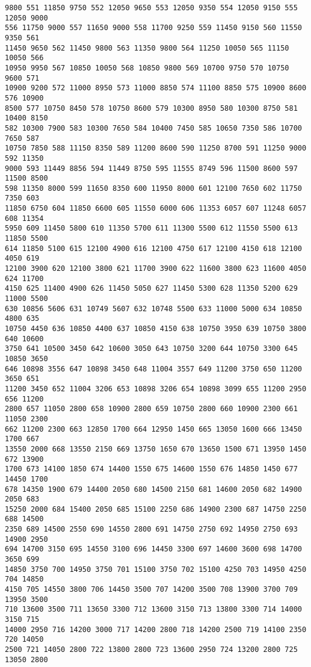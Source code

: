 \documentclass[11pt]{article}
\begin{document}
\begin{Verbatim}[commandchars=\\\{\}]
9800 551 11850 9750 552 12050 9650 553 12050 9350 554 12050 9150 555 12050 9000
556 11750 9000 557 11650 9000 558 11700 9250 559 11450 9150 560 11550 9350 561
11450 9650 562 11450 9800 563 11350 9800 564 11250 10050 565 11150 10050 566
10950 9950 567 10850 10050 568 10850 9800 569 10700 9750 570 10750 9600 571
10900 9200 572 11000 8950 573 11000 8850 574 11100 8850 575 10900 8600 576 10900
8500 577 10750 8450 578 10750 8600 579 10300 8950 580 10300 8750 581 10400 8150
582 10300 7900 583 10300 7650 584 10400 7450 585 10650 7350 586 10700 7650 587
10750 7850 588 11150 8350 589 11200 8600 590 11250 8700 591 11250 9000 592 11350
9000 593 11449 8856 594 11449 8750 595 11555 8749 596 11500 8600 597 11500 8500
598 11350 8000 599 11650 8350 600 11950 8000 601 12100 7650 602 11750 7350 603
11850 6750 604 11850 6600 605 11550 6000 606 11353 6057 607 11248 6057 608 11354
5950 609 11450 5800 610 11350 5700 611 11300 5500 612 11550 5500 613 11850 5500
614 11850 5100 615 12100 4900 616 12100 4750 617 12100 4150 618 12100 4050 619
12100 3900 620 12100 3800 621 11700 3900 622 11600 3800 623 11600 4050 624 11700
4150 625 11400 4900 626 11450 5050 627 11450 5300 628 11350 5200 629 11000 5500
630 10856 5606 631 10749 5607 632 10748 5500 633 11000 5000 634 10850 4800 635
10750 4450 636 10850 4400 637 10850 4150 638 10750 3950 639 10750 3800 640 10600
3750 641 10500 3450 642 10600 3050 643 10750 3200 644 10750 3300 645 10850 3650
646 10898 3556 647 10898 3450 648 11004 3557 649 11200 3750 650 11200 3650 651
11200 3450 652 11004 3206 653 10898 3206 654 10898 3099 655 11200 2950 656 11200
2800 657 11050 2800 658 10900 2800 659 10750 2800 660 10900 2300 661 11050 2300
662 11200 2300 663 12850 1700 664 12950 1450 665 13050 1600 666 13450 1700 667
13550 2000 668 13550 2150 669 13750 1650 670 13650 1500 671 13950 1450 672 13900
1700 673 14100 1850 674 14400 1550 675 14600 1550 676 14850 1450 677 14450 1700
678 14350 1900 679 14400 2050 680 14500 2150 681 14600 2050 682 14900 2050 683
15250 2000 684 15400 2050 685 15100 2250 686 14900 2300 687 14750 2250 688 14500
2350 689 14500 2550 690 14550 2800 691 14750 2750 692 14950 2750 693 14900 2950
694 14700 3150 695 14550 3100 696 14450 3300 697 14600 3600 698 14700 3650 699
14850 3750 700 14950 3750 701 15100 3750 702 15100 4250 703 14950 4250 704 14850
4150 705 14550 3800 706 14450 3500 707 14200 3500 708 13900 3700 709 13950 3500
710 13600 3500 711 13650 3300 712 13600 3150 713 13800 3300 714 14000 3150 715
14000 2950 716 14200 3000 717 14200 2800 718 14200 2500 719 14100 2350 720 14050
2500 721 14050 2800 722 13800 2800 723 13600 2950 724 13200 2800 725 13050 2800

\end{Verbatim}
\end{document}
